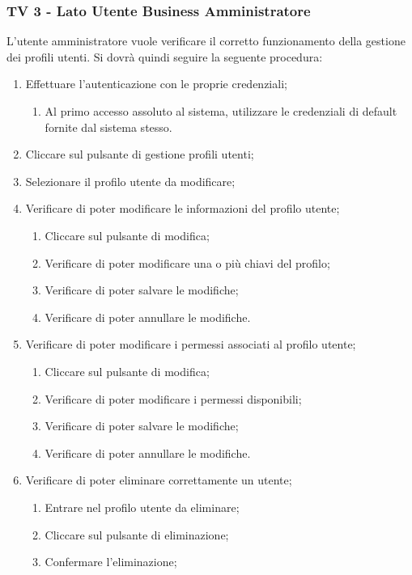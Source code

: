 \subsubsection{TV 3 - Lato Utente Business Amministratore}

L'utente amministratore vuole verificare il corretto funzionamento della gestione dei profili utenti.
Si dovrà quindi seguire la seguente procedura:

\begin{enumerate}
\item Effettuare l'autenticazione con le proprie credenziali;
\begin{enumerate}
\item Al primo accesso assoluto al sistema, utilizzare le credenziali di default fornite dal sistema stesso.
\end{enumerate}
\item Cliccare sul pulsante di gestione profili utenti;
\item Selezionare il profilo utente da modificare;
\item Verificare di poter modificare le informazioni del profilo utente;
\begin{enumerate}
\item Cliccare sul pulsante di modifica;
\item Verificare di poter modificare una o più chiavi del profilo;
\item Verificare di poter salvare le modifiche;
\item Verificare di poter annullare le modifiche.
\end{enumerate}
\item Verificare di poter modificare i permessi associati al profilo utente;
\begin{enumerate}
\item Cliccare sul pulsante di modifica;
\item Verificare di poter modificare i permessi disponibili;
\item Verificare di poter salvare le modifiche;
\item Verificare di poter annullare le modifiche.
\end{enumerate}
\item Verificare di poter eliminare correttamente un utente;
\begin{enumerate}
\item Entrare nel profilo utente da eliminare;
\item Cliccare sul pulsante di eliminazione;
\item Confermare l'eliminazione;

\end{enumerate}
\end{enumerate}
